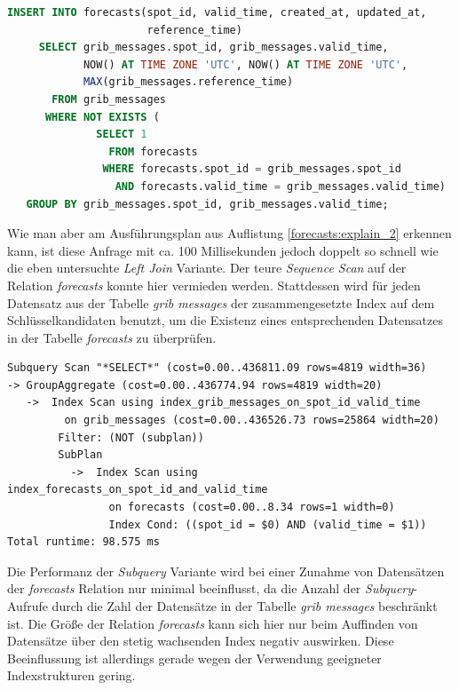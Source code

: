 \begin{lstlisting}[captionpos=b, caption=Hinzufügen von Datensätzen mittels \textit{Subquery}, label=forecasts:insert_2, language=SQL]
INSERT INTO forecasts(spot_id, valid_time, created_at, updated_at, 
                      reference_time)
     SELECT grib_messages.spot_id, grib_messages.valid_time, 
            NOW() AT TIME ZONE 'UTC', NOW() AT TIME ZONE 'UTC', 
            MAX(grib_messages.reference_time)
       FROM grib_messages
      WHERE NOT EXISTS (
              SELECT 1 
                FROM forecasts 
               WHERE forecasts.spot_id = grib_messages.spot_id
                 AND forecasts.valid_time = grib_messages.valid_time)
   GROUP BY grib_messages.spot_id, grib_messages.valid_time;
\end{lstlisting}

Wie man aber am Ausführungsplan aus Auflistung
\ref{forecasts:explain_2} erkennen kann, ist diese Anfrage mit ca. 100
Millisekunden jedoch doppelt so schnell wie die eben untersuchte
\textit{Left Join} Variante. Der teure \textit{Sequence Scan} auf der
Relation \textit{forecasts} konnte hier vermieden werden. Stattdessen
wird für jeden Datensatz aus der Tabelle \textit{grib\textunderscore
  messages} der zusammengesetzte Index auf dem Schlüsselkandidaten
benutzt, um die Existenz eines entsprechenden Datensatzes in der
Tabelle \textit{forecasts} zu überprüfen.

\begin{lstlisting}[captionpos=b, caption=Ausführungsplan der \textit{Subquery}, label=forecasts:explain_2]
Subquery Scan "*SELECT*" (cost=0.00..436811.09 rows=4819 width=36)
-> GroupAggregate (cost=0.00..436774.94 rows=4819 width=20) 
   ->  Index Scan using index_grib_messages_on_spot_id_valid_time 
         on grib_messages (cost=0.00..436526.73 rows=25864 width=20)
        Filter: (NOT (subplan))
        SubPlan
          ->  Index Scan using index_forecasts_on_spot_id_and_valid_time 
                on forecasts (cost=0.00..8.34 rows=1 width=0) 
                Index Cond: ((spot_id = $0) AND (valid_time = $1))
Total runtime: 98.575 ms
\end{lstlisting}

Die Performanz der \textit{Subquery} Variante wird bei einer Zunahme
von Datensätzen der \textit{forecasts} Relation nur minimal
beeinflusst, da die Anzahl der \textit{Subquery}-Aufrufe durch die
Zahl der Datensätze in der Tabelle \textit{grib\textunderscore
  messages} beschränkt ist. Die Größe der Relation \textit{forecasts}
kann sich hier nur beim Auffinden von Datensätze über den stetig
wachsenden Index negativ auswirken. Diese Beeinflussung ist allerdings
gerade wegen der Verwendung geeigneter Indexstrukturen gering.

